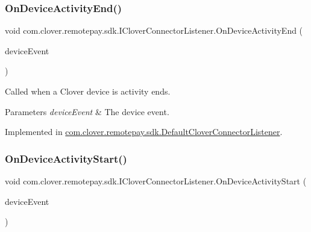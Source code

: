 \subsubsection{\texorpdfstring{On\+Device\+Activity\+End()}{OnDeviceActivityEnd()}}
{\footnotesize\ttfamily void com.\+clover.\+remotepay.\+sdk.\+I\+Clover\+Connector\+Listener.\+On\+Device\+Activity\+End (\begin{DoxyParamCaption}\item[{\hyperlink{classcom_1_1clover_1_1remotepay_1_1sdk_1_1_clover_device_event}{Clover\+Device\+Event}}]{device\+Event }\end{DoxyParamCaption})}



Called when a Clover device is activity ends. 


\begin{DoxyParams}{Parameters}
{\em device\+Event} & The device event.\\
\hline
\end{DoxyParams}


Implemented in \hyperlink{classcom_1_1clover_1_1remotepay_1_1sdk_1_1_default_clover_connector_listener_a3f72c953ad6dafe916936e23a5d38cd5}{com.\+clover.\+remotepay.\+sdk.\+Default\+Clover\+Connector\+Listener}.

\mbox{\label{interfacecom_1_1clover_1_1remotepay_1_1sdk_1_1_i_clover_connector_listener_a303298434023376030a41a639ceff40b}} 
\subsubsection{\texorpdfstring{On\+Device\+Activity\+Start()}{OnDeviceActivityStart()}}
{\footnotesize\ttfamily void com.\+clover.\+remotepay.\+sdk.\+I\+Clover\+Connector\+Listener.\+On\+Device\+Activity\+Start (\begin{DoxyParamCaption}\item[{\hyperlink{classcom_1_1clover_1_1remotepay_1_1sdk_1_1_clover_device_event}{Clover\+Device\+Event}}]{device\+Event }\end{DoxyParamCaption})}



